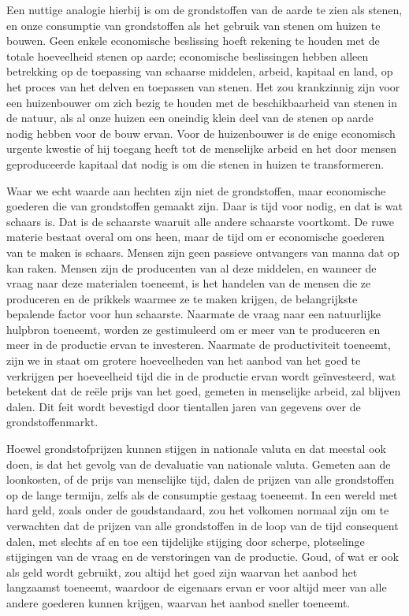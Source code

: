 \documentclass[
  a5paper,
  smalldemyvopaper,11pt,twoside,onecolumn,openright,extrafontsizes,
hidelinks]{memoir}
\begin{document}
Een nuttige analogie hierbij is om de grondstoffen van de aarde te zien
als stenen, en onze consumptie van grondstoffen als het gebruik van
stenen om huizen te bouwen. Geen enkele economische beslissing hoeft
rekening te houden met de totale hoeveelheid stenen op aarde;
economische beslissingen hebben alleen betrekking op de toepassing van
schaarse middelen, arbeid, kapitaal en land, op het proces van het
delven en toepassen van stenen. Het zou krankzinnig zijn voor een
huizenbouwer om zich bezig te houden met de beschikbaarheid van stenen
in de natuur, als al onze huizen een oneindig klein deel van de stenen
op aarde nodig hebben voor de bouw ervan. Voor de huizenbouwer is de
enige economisch urgente kwestie of hij toegang heeft tot de menselijke
arbeid en het door mensen geproduceerde kapitaal dat nodig is om die
stenen in huizen te transformeren.

Waar we echt waarde aan hechten zijn niet de grondstoffen, maar
economische goederen die van grondstoffen gemaakt zijn. Daar is tijd
voor nodig, en dat is wat schaars is. Dat is de schaarste waaruit alle
andere schaarste voortkomt. De ruwe materie bestaat overal om ons heen,
maar de tijd om er economische goederen van te maken is schaars. Mensen
zijn geen passieve ontvangers van manna dat op kan raken. Mensen zijn de
producenten van al deze middelen, en wanneer de vraag naar deze
materialen toeneemt, is het handelen van de mensen die ze produceren en
de prikkels waarmee ze te maken krijgen, de belangrijkste bepalende
factor voor hun schaarste. Naarmate de vraag naar een natuurlijke
hulpbron toeneemt, worden ze gestimuleerd om er meer van te produceren
en meer in de productie ervan te investeren. Naarmate de productiviteit
toeneemt, zijn we in staat om grotere hoeveelheden van het aanbod van
het goed te verkrijgen per hoeveelheid tijd die in de productie ervan
wordt geïnvesteerd, wat betekent dat de reële prijs van het goed,
gemeten in menselijke arbeid, zal blijven dalen. Dit feit wordt
bevestigd door tientallen jaren van gegevens over de grondstoffenmarkt.

Hoewel grondstofprijzen kunnen stijgen in nationale valuta en dat
meestal ook doen, is dat het gevolg van de devaluatie van nationale
valuta. Gemeten aan de loonkosten, of de prijs van menselijke tijd,
dalen de prijzen van alle grondstoffen op de lange termijn, zelfs als de
consumptie gestaag toeneemt. In een wereld met hard geld, zoals onder de
goudstandaard, zou het volkomen normaal zijn om te verwachten dat de
prijzen van alle grondstoffen in de loop van de tijd consequent dalen,
met slechts af en toe een tijdelijke stijging door scherpe, plotselinge
stijgingen van de vraag en de verstoringen van de productie. Goud, of
wat er ook als geld wordt gebruikt, zou altijd het goed zijn waarvan het
aanbod het langzaamst toeneemt, waardoor de eigenaars ervan er voor
altijd meer van alle andere goederen kunnen krijgen, waarvan het aanbod
sneller toeneemt.
\end{document}
